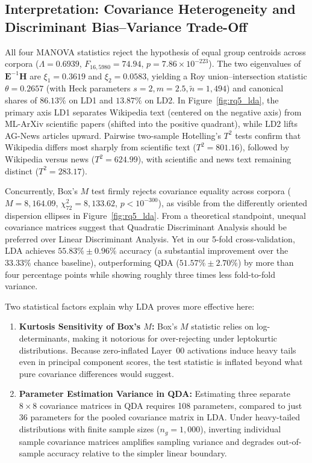 \documentclass[12pt, a4paper, oneside]{report}
\theoremstyle{definition}
\newcommand{\mat}[1]{\mathbf{#1}}
\begin{document}
\subsection{Interpretation: Covariance Heterogeneity and Discriminant Bias--Variance Trade-Off}

All four MANOVA statistics reject the hypothesis of equal group centroids across corpora ($\Lambda = 0.6939$, $F_{16, 5980} = 74.94$, $p = 7.86 \times 10^{-223}$). The two eigenvalues of $\mat{E}^{-1}\mat{H}$ are $\xi_1 = 0.3619$ and $\xi_2 = 0.0583$, yielding a Roy union--intersection statistic $\theta = 0.2657$ (with Heck parameters $s = 2, m = 2.5, \tilde{n} = 1{,}494$) and canonical shares of $86.13\%$ on LD1 and $13.87\%$ on LD2. In Figure~\ref{fig:rq5_lda}, the primary axis LD1 separates Wikipedia text (centered on the negative axis) from ML-ArXiv scientific papers (shifted into the positive quadrant), while LD2 lifts AG-News articles upward. Pairwise two-sample Hotelling's $T^2$ tests confirm that Wikipedia differs most sharply from scientific text ($T^2 = 801.16$), followed by Wikipedia versus news ($T^2 = 624.99$), with scientific and news text remaining distinct ($T^2 = 283.17$).

Concurrently, Box's $M$ test firmly rejects covariance equality across corpora ($M = 8{,}164.09$, $\chi^2_{72} = 8{,}133.62$, $p < 10^{-300}$), as visible from the differently oriented dispersion ellipses in Figure~\ref{fig:rq5_lda}. From a theoretical standpoint, unequal covariance matrices suggest that Quadratic Discriminant Analysis should be preferred over Linear Discriminant Analysis. Yet in our 5-fold cross-validation, LDA achieves $55.83\% \pm 0.96\%$ accuracy (a substantial improvement over the $33.33\%$ chance baseline), outperforming QDA ($51.57\% \pm 2.70\%$) by more than four percentage points while showing roughly three times less fold-to-fold variance.

Two statistical factors explain why LDA proves more effective here:
\begin{enumerate}
    \item \textbf{Kurtosis Sensitivity of Box's $M$:} Box's $M$ statistic relies on log-determinants, making it notorious for over-rejecting under leptokurtic distributions. Because zero-inflated Layer~00 activations induce heavy tails even in principal component scores, the test statistic is inflated beyond what pure covariance differences would suggest.
    \item \textbf{Parameter Estimation Variance in QDA:} Estimating three separate $8 \times 8$ covariance matrices in QDA requires 108 parameters, compared to just 36 parameters for the pooled covariance matrix in LDA. Under heavy-tailed distributions with finite sample sizes ($n_g = 1{,}000$), inverting individual sample covariance matrices amplifies sampling variance and degrades out-of-sample accuracy relative to the simpler linear boundary.
\end{enumerate}
\end{document}
